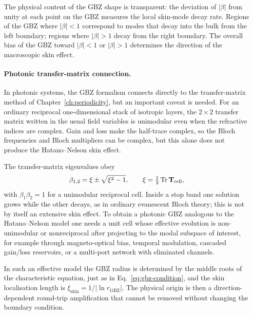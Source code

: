 The physical content of the GBZ shape is transparent: the deviation
of $|\beta|$ from unity at each point on the GBZ measures the local
skin-mode decay rate. Regions of the GBZ where $|\beta| < 1$
correspond to modes that decay into the bulk from the left boundary;
regions where $|\beta| > 1$ decay from the right boundary. The
overall bias of the GBZ toward $|\beta| < 1$ or $|\beta| > 1$
determines the direction of the macroscopic skin effect.

\paragraph{Photonic transfer-matrix connection.}
In photonic systems, the GBZ formalism connects directly to the
transfer-matrix method of Chapter~\ref{ch:periodicity}, but an important
caveat is needed. For an ordinary reciprocal one-dimensional stack of
isotropic layers, the $2\times2$ transfer matrix written in the usual
field variables is unimodular even when the refractive indices are
complex. Gain and loss make the half-trace complex, so the Bloch
frequencies and Bloch multipliers can be complex, but this alone does
not produce the Hatano--Nelson skin effect.

The transfer-matrix eigenvalues obey
\begin{equation}
 \beta_{1,2} = \xi \pm \sqrt{\xi^2 - 1},
 \qquad \xi = \tfrac{1}{2}\operatorname{Tr}\mathbf{T}_{\mathrm{cell}},
 \label{eq:photonic-transfer-eigenvalues}
\end{equation}
with $\beta_1\beta_2=1$ for a unimodular reciprocal cell. Inside a stop
band one solution grows while the other decays, as in ordinary evanescent
Bloch theory; this is not by itself an extensive skin effect. To obtain
a photonic GBZ analogous to the Hatano--Nelson model one needs a unit
cell whose effective evolution is non-unimodular or nonreciprocal after
projecting to the modal subspace of interest, for example through
magneto-optical bias, temporal modulation, cascaded gain/loss reservoirs,
or a multi-port network with eliminated channels.

In such an effective model the GBZ radius is determined by the middle
roots of the characteristic equation, just as in
Eq.~\eqref{eq:gbz-condition}, and the skin localisation length is
$\xi_{\mathrm{skin}}=1/|\ln r_{\mathrm{GBZ}}|$. The physical origin is
then a direction-dependent round-trip amplification that cannot be
removed without changing the boundary condition.

